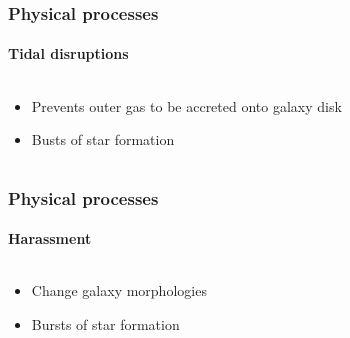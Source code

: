 \begin{frame}
    \frametitle{Physical processes}
    \framesubtitle{Tidal disruptions}
    \begin{columns}
        \begin{column}{0.5\textwidth}
            \begin{block}{}
                \begin{itemize}
                    \item<1-> Prevents outer gas to be accreted onto galaxy
                        disk
                    \item<2-> Busts of star formation
                \end{itemize}
            \end{block}
        \end{column}
        \begin{column}{0.5\textwidth}
        \end{column}
    \end{columns}
\end{frame}

\begin{frame}
    \frametitle{Physical processes}
    \framesubtitle{Harassment}
    \begin{columns}
        \begin{column}{0.5\textwidth}
            \begin{block}{}
                \begin{itemize}
                    \item<1-> Change galaxy morphologies
                    \item<2-> Bursts of star formation
                \end{itemize}
            \end{block}
        \end{column}
        \begin{column}{0.5\textwidth}
        \end{column}
    \end{columns}
\end{frame}

